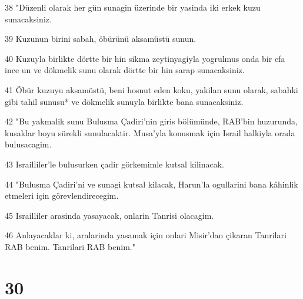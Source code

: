 \par 38 "Düzenli olarak her gün sunagin üzerinde bir yasinda iki erkek kuzu sunacaksiniz.
\par 39 Kuzunun birini sabah, öbürünü aksamüstü sunun.
\par 40 Kuzuyla birlikte dörtte bir hin sikma zeytinyagiyla yogrulmus onda bir efa ince un ve dökmelik sunu olarak dörtte bir hin sarap sunacaksiniz.
\par 41 Öbür kuzuyu aksamüstü, beni hosnut eden koku, yakilan sunu olarak, sabahki gibi tahil sunusu* ve dökmelik sunuyla birlikte bana sunacaksiniz.
\par 42 "Bu yakmalik sunu Bulusma Çadiri'nin giris bölümünde, RAB'bin huzurunda, kusaklar boyu sürekli sunulacaktir. Musa'yla konusmak için Israil halkiyla orada bulusacagim.
\par 43 Israilliler'le bulusurken çadir görkemimle kutsal kilinacak.
\par 44 "Bulusma Çadiri'ni ve sunagi kutsal kilacak, Harun'la ogullarini bana kâhinlik etmeleri için görevlendirecegim.
\par 45 Israilliler arasinda yasayacak, onlarin Tanrisi olacagim.
\par 46 Anlayacaklar ki, aralarinda yasamak için onlari Misir'dan çikaran Tanrilari RAB benim. Tanrilari RAB benim."

\chapter{30}

